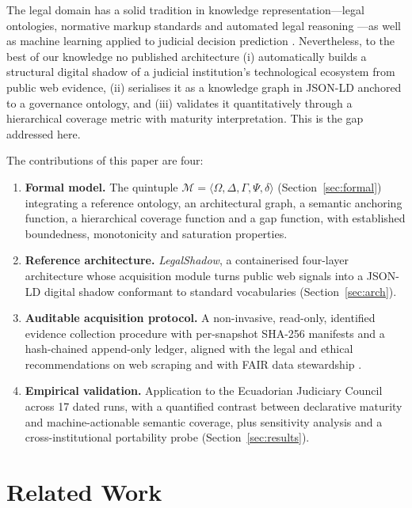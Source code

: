 \documentclass[engproc,article,submit,moreauthors]{Definitions/mdpi}
\begin{document}
The legal domain has a solid tradition in knowledge representation---legal ontologies, normative markup standards and automated legal reasoning \cite{BenchCapon2012,Casanovas2016}---as well as machine learning applied to judicial decision prediction \cite{Katz2017,Medvedeva2020}. Nevertheless, to the best of our knowledge no published architecture (i) automatically builds a structural digital shadow of a judicial institution's technological ecosystem from public web evidence, (ii) serialises it as a knowledge graph in JSON-LD anchored to a governance ontology, and (iii) validates it quantitatively through a hierarchical coverage metric with maturity interpretation. This is the gap addressed here.

The contributions of this paper are four:

\begin{enumerate}
\item \textbf{Formal model.} The quintuple $\mathcal{M}=\langle \Omega, \Delta, \Gamma, \Psi, \delta \rangle$ (Section~\ref{sec:formal}) integrating a reference ontology, an architectural graph, a semantic anchoring function, a hierarchical coverage function and a gap function, with established boundedness, monotonicity and saturation properties.
\item \textbf{Reference architecture.} \emph{LegalShadow}, a containerised four-layer architecture whose acquisition module turns public web signals into a JSON-LD digital shadow conformant to standard vocabularies (Section~\ref{sec:arch}).
\item \textbf{Auditable acquisition protocol.} A non-invasive, read-only, identified evidence collection procedure with per-snapshot SHA-256 manifests and a hash-chained append-only ledger, aligned with the legal and ethical recommendations on web scraping \cite{Krotov2020} and with FAIR data stewardship \cite{Wilkinson2016}.
\item \textbf{Empirical validation.} Application to the Ecuadorian Judiciary Council across 17 dated runs, with a quantified contrast between declarative maturity and machine-actionable semantic coverage, plus sensitivity analysis and a cross-institutional portability probe (Section~\ref{sec:results}).
\end{enumerate}

\section{Related Work}
\label{sec:related}
\end{document}
